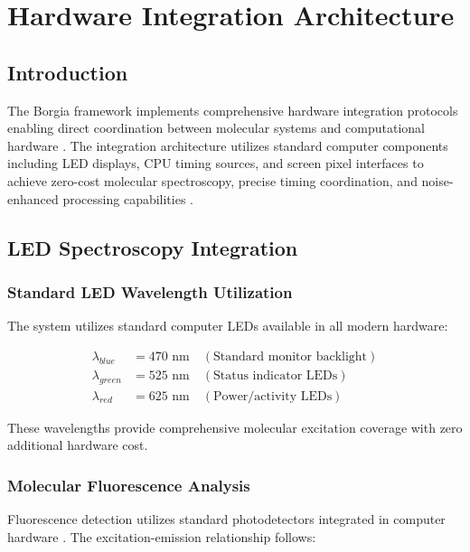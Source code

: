 \section{Hardware Integration Architecture}

\subsection{Introduction}

The Borgia framework implements comprehensive hardware integration protocols enabling direct coordination between molecular systems and computational hardware \cite{sterling2015principles}. The integration architecture utilizes standard computer components including LED displays, CPU timing sources, and screen pixel interfaces to achieve zero-cost molecular spectroscopy, precise timing coordination, and noise-enhanced processing capabilities \cite{sachikonye2024oscillatory}.

\subsection{LED Spectroscopy Integration}

\subsubsection{Standard LED Wavelength Utilization}

The system utilizes standard computer LEDs available in all modern hardware:

\begin{align}
\lambda_{blue} &= 470 \text{ nm} \quad (\text{Standard monitor backlight}) \\
\lambda_{green} &= 525 \text{ nm} \quad (\text{Status indicator LEDs}) \\
\lambda_{red} &= 625 \text{ nm} \quad (\text{Power/activity LEDs})
\end{align}

These wavelengths provide comprehensive molecular excitation coverage with zero additional hardware cost.

\subsubsection{Molecular Fluorescence Analysis}

Fluorescence detection utilizes standard photodetectors integrated in computer hardware \cite{lakowicz2006principles}. The excitation-emission relationship follows:

